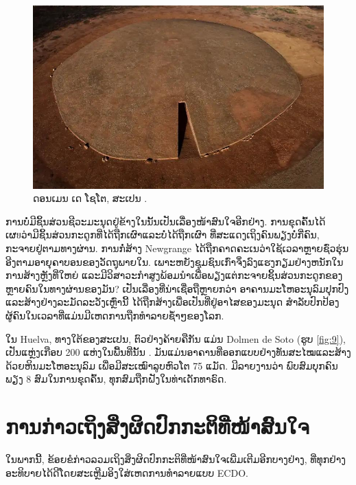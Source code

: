 \documentclass[10pt,twocolumn,letterpaper]{article}
\begin{document}
\begin{figure}[b]
\begin{center}
   \includegraphics[width=1\linewidth]{dolmen.jpg}
\end{center}
   \caption{ດອນເມນ ເດ ໂຊໂຕ, ສະເປນ \cite{53}.}
\label{fig:9}
\label{fig:onecol}
\end{figure}

ການບໍ່ມີຊິ້ນສ່ວນຊີວະມະນຸດຢູ່ຂ້າງໃນນັ້ນເປັນເລື່ອງໜ້າສົນໃຈອີກຢ່າງ. ການຂຸດຄົ້ນໄດ້ເຜยວ່າມີຊິ້ນສ່ວນກະດູກທີ່ໄດ້ຖືກເຜົາແລະບໍ່ໄດ້ຖືກເຜົາ ທີ່ສະແດງເຖິງຄົນພຽງບໍ່ກີ່ຄົນ, ກະຈາຍຢູ່ຕາມທາງຜ່ານ. ການກໍ່ສ້າງ Newgrange ໄດ້ຖືກຄາດຄະເນວ່າໃຊ້ເວລາຫຼາຍຊົ່ວຮຸ່ນ ອີງຕາມອາຍຸຄາບອນຂອງວັດຖຸພາຍໃນ. ເພາະຫຍັງຊຸມຊົນເກົ່າຈຶ່ງລົງແຮງກຽມຢ່າງຫນັກໃນການສ້າງຫຼັງທີ່ໃຫຍ່ ແລະມີວິສາວະກຳສູງພ້ອມນໍາເພື່ອພຽງແຕ່ກະຈາຍຊິ້ນສ່ວນກະດູກຂອງຫຼາຍຄົນໃນທາງຜ່ານຂອງມັນ? ເປັນເລື່ອງທີ່ນ່າເຊື່ອຖືຫຼາຍກວ່າ ອາຄານມະໂຫອະນຸລົມປຸກປົງແລະສ້າງຢ່າງລະມັດລະວັງເຫຼົ່ານີ້ ໄດ້ຖືກສ້າງເພື່ອເປັນທີ່ຢູ່ອາໄສຂອງມະນຸດ ສໍາລັບປົກປ້ອງຜູ້ຄົນໃນເວລາທີ່ແມ່ນມີເຫດການຖືກທໍາລາຍຊ້ຳໆຂອງໂລກ.

ໃນ Huelva, ທາງໃຕ້ຂອງສະເປນ, ຕົວຢ່າງຄ້າຍຄືກັນ ແມ່ນ Dolmen de Soto (ຮູບ \ref{fig:9}), ເປັນແຫຼ່ງເກືອບ 200 ແຫ່ງໃນພື້ນທີ່ນັ້ນ \cite{72,32}. ມັນແມ່ນອາຄານທີ່ອອກແບບຢ່າງທັນສະໄໝແລະສ້າງດ້ວຍຫິນມະໂຫອະນຸລົມ ເພື່ອມີສະເໝົາລູບຫົວໂຕ 75 ແມັດ. ມີລາຍງານວ່າ ພົບສົມບຸກຄົນພຽງ 8 ສົມໃນການຂຸດຄົ້ນ, ທຸກສົມຖືກຝັງໃນທ່າເດັກທາຣົດ.

\section{ການກ່າວເຖິງສິ່ງຜິດປົກກະຕິທີ່ໜ້າສົນໃຈ}

ໃນພາກນີ້, ຂ້ອຍຂໍກ່າວລວມເຖິງສິ່ງຜິດປົກກະຕິທີ່ໜ້າສົນໃຈເພີ່ມເຕີມອີກບາງຢ່າງ, ທີ່ທຸກຢ່າງອະທິບາຍໄດ້ດີໂດຍສະເຫຼີມອິງໃສ່ເຫດການທຳລາຍແບບ ECDO.
\end{document}
